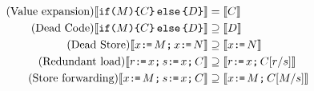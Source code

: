  \begin{align*}
\tag{Value expansion}
  \sem{\IF{\aExp}\THEN\aCmd\ELSE\bCmd\FI} &=
  \sem{\aCmd}  \\
  \tag{Dead Code} 
  \sem{\IF{\aExp}\THEN\aCmd\ELSE\bCmd\FI} &\supseteq 
  \sem{\bCmd} \\
  \tag{Dead Store} 
  \sem{\aLoc \GETS \aExp \SEMI \aLoc  \GETS \bExp} &\supseteq 
  \sem{\aLoc \GETS \bExp}\\    
  \tag{Redundant load}
  \sem{\aReg \GETS \aLoc  \SEMI \bReg \GETS \aLoc  \SEMI \aCmd} &\supseteq
  \sem{\aReg \GETS \aLoc \SEMI \aCmd[\aReg/\bReg]} \\
  \tag{Store forwarding} 
  \sem{\aLoc \GETS \aExp \SEMI \bReg \GETS \aLoc \SEMI \aCmd} &\supseteq 
  \sem{\aLoc \GETS \aExp \SEMI \aCmd[\aExp/\bReg]}
\end{align*}

